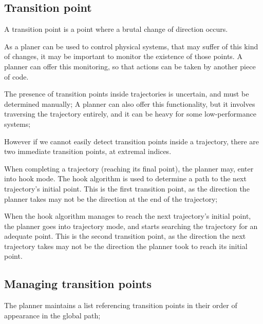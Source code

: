 \newpage


\subsection{Transition point}

A transition point is a point where a brutal change of direction occurs.
\newline

As a planer can be used to control physical systems, that may suffer of this kind of changes, it may be 
important to monitor the existence of those points.
A planner can offer this monitoring, so that actions can be taken by another piece of code.
\newline

The presence of transition points inside trajectories is uncertain, and must be determined manually;
A planner can also offer this functionality, but it involves traversing the trajectory entirely, and 
it can be heavy for some low-performance systems;
\newline

However if we cannot easily detect transition points inside a trajectory, there are two immediate 
transition points, at extremal indices.
\newline

When completing a trajectory (reaching its final point), the planner may, enter into hook mode.
The hook algorithm is used to determine a path to the next trajectory's initial point.
This is the first transition point, as the direction the planner takes may not be the direction at the end
of the trajectory;
\newline

When the hook algorithm manages to reach the next trajectory's initial point, the planner goes into 
trajectory mode, and starts searching the trajectory for an adequate point.
This is the second transition point, as the direction the next trajectory takes may not be the direction 
the planner took to reach its initial point.
\newline


\subsection{Managing transition points}

The planner maintains a list referencing transition points in their order of appearance in the global 
path;
\newline

